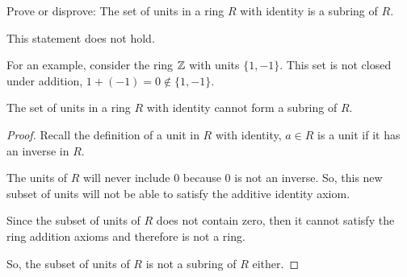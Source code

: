 \documentclass[../hw3]{subfiles}
\begin{document}
\begin{problem}
Prove or disprove: The set of units in a ring $R$ with identity is a subring of  $R$.
\end{problem}
This statement does not hold.

For an example, consider the ring $\mathbb{Z}$ with units $\{1,-1\} $. This set is not closed under addition, $1+(-1)=0\not\in \{1,-1\} $.
\begin{proposition}
	The set of units in a ring $R$ with identity cannot form a subring of  $R$.
\end{proposition}
\begin{proof}
	Recall the definition of a unit in $R$ with identity, $a\in R$ is a unit if it has an inverse in $R$.

	The units of  $R$ will never include 0 because 0 is not an inverse.
	So, this new subset of units will not be able to satisfy the additive identity axiom.

	Since the subset of units of $R$ does not contain zero, then it cannot satisfy the ring addition axioms and therefore is not a ring.

	So, the subset of units of  $R$ is not a subring of  $R$ either.
\end{proof}
\end{document}
